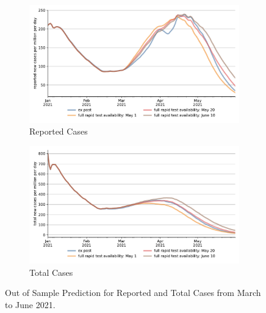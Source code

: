 \begin{figure}[ht] %
    \centering
    \begin{subfigure}[b]{.425\textwidth}
        \centering
        \includegraphics[width=\textwidth]{figures/results/figures/scenario_comparisons/robustness_check/full_new_known_case}
        \caption{Reported Cases}
        \label{fig:robustness_check_new_known_case}
    \end{subfigure}%
    \hfill
    \begin{subfigure}[b]{.425\textwidth}
        \centering
        \includegraphics[width=\textwidth]{figures/results/figures/scenario_comparisons/robustness_check/full_newly_infected}
        \caption{Total Cases}
        \label{fig:robustness_check_newly_infected}
    \end{subfigure}
    \caption{Out of Sample Prediction for Reported and Total Cases from March to June
        2021.}
    \label{fig:robustness_check_detailed}
\end{figure}
